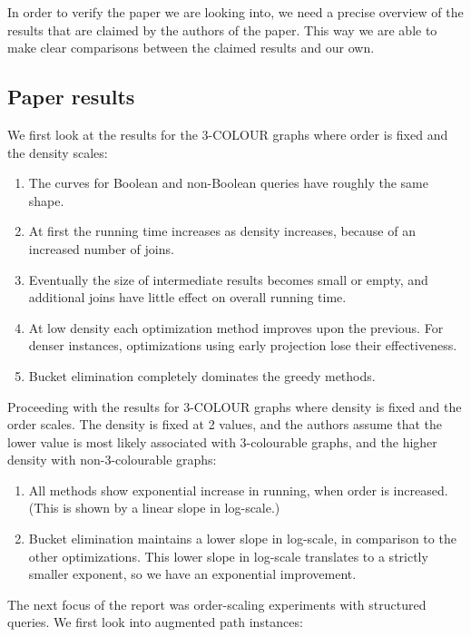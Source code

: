 In order to verify the paper we are looking into, we need a precise overview of the results that are claimed by the authors of the paper. This way we are able to make clear comparisons between the claimed results and our own.

\subsection{Paper results}
We first look at the results for the 3-COLOUR graphs where order is fixed and the density scales:
\begin{enumerate}
	\item \label{claim:Curve} The curves for Boolean and non-Boolean queries have roughly the same shape.
	\item \label{claim:RunINc} At first the running time increases as density increases, because of an increased number of joins.
	\item \label{claim:SizzeInter} Eventually the size of intermediate results becomes small or empty, and additional joins have little effect on overall running time.
	\item \label{claim:IncImprov} At low density each optimization method improves upon the previous. For denser instances, optimizations using early projection lose their effectiveness.
	\item \label{claim:BucektDominates} Bucket elimination completely dominates the greedy methods.
\end{enumerate}

\noindent Proceeding with the results for 3-COLOUR graphs where density is fixed and the order scales. The density is fixed at 2 values, and the authors assume that the lower value is most likely associated with 3-colourable graphs, and the higher density with non-3-colourable graphs:

\begin{enumerate}[resume]
	\item \label{claim:ExpoInc} All methods show exponential increase in running, when order is increased. (This is shown by a linear slope in log-scale.)
	\item \label{claim:BucketExpoImpr} Bucket elimination maintains a lower slope in log-scale, in comparison to the other optimizations. This lower slope in log-scale translates to a strictly smaller exponent, so we have an exponential improvement.
\end{enumerate}

\noindent The next focus of the report was order-scaling experiments with structured queries. We first look into augmented path instances:

